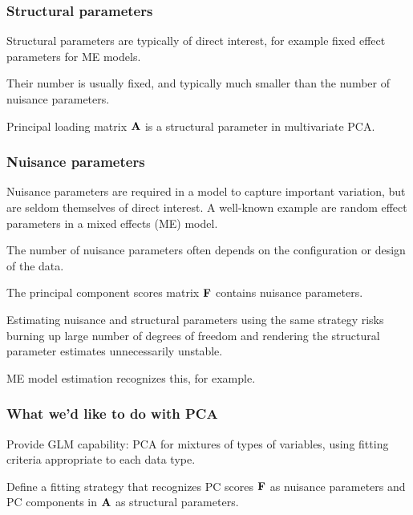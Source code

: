 \documentclass[11pt]{beamer}
\begin{document}

\begin{frame}

\frametitle{Structural parameters}

\bi
  \item Structural parameters are typically of direct interest, for example fixed effect parameters for ME models.
  \item Their number is usually fixed, and typically much smaller than the number of nuisance parameters.
  \item Principal loading matrix $\mbox{\bf A}$ is a structural parameter in multivariate PCA.
\ei

\end{frame}


\begin{frame}

\frametitle{Nuisance parameters}

\bi
  \item Nuisance parameters are required in a model to capture important variation, but are seldom themselves of direct interest.  A well-known example are random effect parameters in a mixed effects (ME) model.
  \item The number of nuisance parameters often depends on the configuration or design of the data.
  \item The principal component scores matrix $\mbox{\bf F}$ contains nuisance parameters.
  \item Estimating nuisance and structural parameters using the same strategy risks burning up large number of degrees of freedom and rendering the structural parameter estimates unnecessarily unstable.  
  \item ME model estimation recognizes this, for example.
\ei

\end{frame}


\begin{frame}

\frametitle{What we'd like to do with PCA}

\bi
  \item Provide GLM capability: PCA for mixtures of types of variables, using fitting criteria
  appropriate to each data type.
  \item Define a fitting strategy that recognizes PC scores $\mbox{\bf F}$ as nuisance parameters
  and PC components in $\mbox{\bf A}$ as structural parameters.
\ei

\end{frame}
\end{document}

